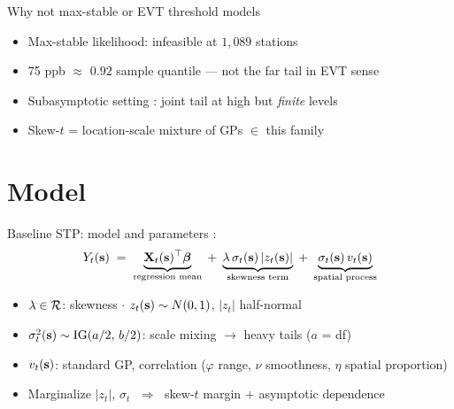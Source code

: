 \documentclass[12pt, aspectratio=169]{beamer}
\begin{document}
\begin{frame}{Why not max-stable or EVT threshold models}
  \begin{itemize}
    \item Max-stable likelihood: infeasible at $1{,}089$ stations
    \item 75 ppb $\approx$ \alert{$0.92$ sample quantile} --- not the far tail in EVT sense
    \item \alert{Subasymptotic} setting \parencite{huser_advances_2022}:
          joint tail at high but \emph{finite} levels
    \item Skew-$t$ = location-scale mixture of GPs $\in$ this family
  \end{itemize}
\end{frame}

\section{Model}

\begin{frame}{Baseline STP: model and parameters}
  \textcite{morris_space-time_2017}:
  \begin{equation*}
    Y_t(\mbox{\bf s}) \;=\;
    \underbrace{\mbox{\bf X}_t(\mbox{\bf s})^\top \mbox{\boldmath $\beta$}}_{\text{regression mean}}
    \;+\;
    \underbrace{\lambda\, \sigma_t(\mbox{\bf s})\, |z_t(\mbox{\bf s})|}_{\text{skewness term}}
    \;+\;
    \underbrace{\sigma_t(\mbox{\bf s})\, v_t(\mbox{\bf s})}_{\text{spatial process}}
  \end{equation*}
  \bigskip
  \begin{itemize}
    \item $\lambda \in {\cal R}$: skewness $\cdot$ $z_t(\mbox{\bf s}) \sim N(0, 1)$,
          $|z_t|$ half-normal
    \item $\sigma^2_t(\mbox{\bf s}) \sim \mathrm{IG}(a/2,\, b/2)$: scale mixing
          $\to$ heavy tails ($a$ = df)
    \item $v_t(\mbox{\bf s})$: standard GP, \Matern correlation
          ($\varphi$ range, $\nu$ smoothness, $\eta$ spatial proportion)
    \item Marginalize $|z_t|$, $\sigma_t$ $\;\Rightarrow\;$
          \alert{skew-$t$ margin} $+$ asymptotic dependence
  \end{itemize}
\end{frame}
\end{document}
